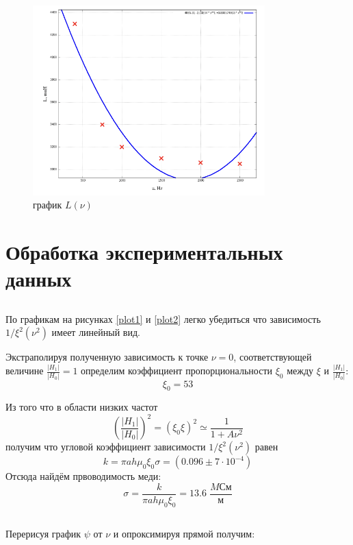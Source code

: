 \documentclass[11pt]{article}
\begin{document}
\begin{figure}[H]
    \centering
    \includegraphics[width=0.8\textwidth]{6.png}
    \caption{график \( L(\nu) \)}
    \label{fig:L}
\end{figure}

\section {Обработка экспериментальных данных}
\subsection{}
\label{sigma_1}
По графикам на рисунках \ref{plot1} и \ref{plot2} легко убедиться что зависимость \( 1/\xi^2(\nu^2) \)
имеет линейный вид.

Экстраполируя полученную зависимость к точке \( \nu = 0 \), соответствующей величине \( \frac{|H_1|}{|H_0|} = 1 \)
определим коэффициент пропорциональности \( \xi_0 \) между \( \xi \) и \( \frac{|H_1|}{|H_0|} \): 
\[ \xi_0 = 53 \]

Из того что в области низких частот
\[ \left(\frac{|H_1|}{|H_0|}\right)^2 = (\xi_0\xi)^2 \simeq \frac{1}{1 + A\nu^2} \]
получим что угловой коэффициент зависимости \( 1/\xi^2(\nu^2) \) равен
\[ k = \pi ah\mu_0\xi_0\sigma = (0.096 \pm 7\cdot10^{-4}) \]
Отсюда найдём првоводимость меди:
\[ \sigma = \frac{k}{\pi ah\mu_0\xi_0} = 13.6\; \frac{MСм}{м} \]

\subsection{}\label{sigma_2}
Перерисуя график \( \psi \) от \( \nu \) и опроксимируя прямой получим:
\end{document}
